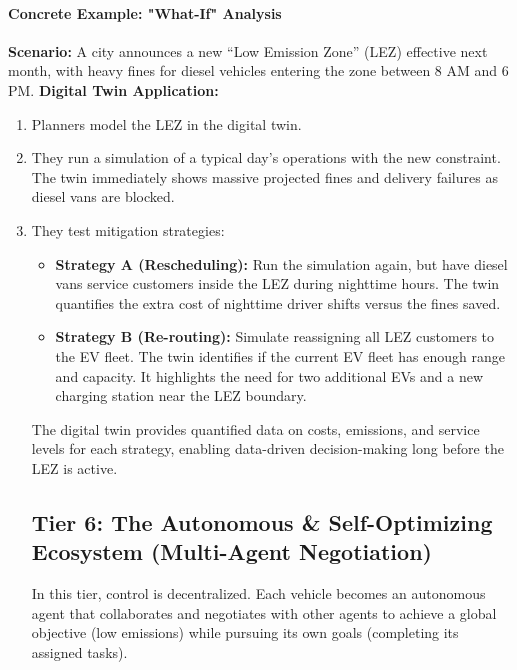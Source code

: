 \documentclass{article}
\begin{document}
\paragraph{Concrete Example: "What-If" Analysis}
\textbf{Scenario:} A city announces a new ``Low Emission Zone'' (LEZ) effective next month, with heavy fines for diesel vehicles entering the zone between 8 AM and 6 PM.
\textbf{Digital Twin Application:}
\begin{enumerate}
    \item Planners model the LEZ in the digital twin.
    \item They run a simulation of a typical day's operations with the new constraint. The twin immediately shows massive projected fines and delivery failures as diesel vans are blocked.
    \item They test mitigation strategies:
        \begin{itemize}
            \item \textbf{Strategy A (Rescheduling):} Run the simulation again, but have diesel vans service customers inside the LEZ during nighttime hours. The twin quantifies the extra cost of nighttime driver shifts versus the fines saved.
            \item \textbf{Strategy B (Re-routing):} Simulate reassigning all LEZ customers to the EV fleet. The twin identifies if the current EV fleet has enough range and capacity. It highlights the need for two additional EVs and a new charging station near the LEZ boundary.
\end{itemize}
The digital twin provides quantified data on costs, emissions, and service levels for each strategy, enabling data-driven decision-making long before the LEZ is active.

\subsection{Tier 6: The Autonomous \& Self-Optimizing Ecosystem (Multi-Agent Negotiation)}
In this tier, control is decentralized. Each vehicle becomes an autonomous agent that collaborates and negotiates with other agents to achieve a global objective (low emissions) while pursuing its own goals (completing its assigned tasks).


\end{enumerate}
\end{document}
